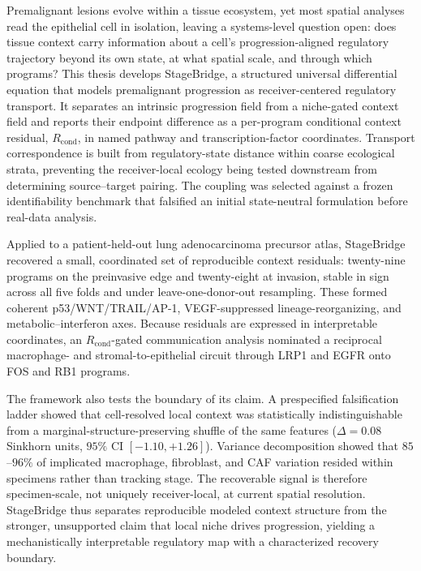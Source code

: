 
Premalignant lesions evolve within a tissue ecosystem, yet most spatial analyses read the epithelial
cell in isolation, leaving a systems-level question open: does tissue context carry information about a
cell's progression-aligned regulatory trajectory beyond its own state, at what spatial scale, and through
which programs? This thesis develops StageBridge, a structured universal differential equation that
models premalignant progression as receiver-centered regulatory transport. It separates an intrinsic
progression field from a niche-gated context field and reports their endpoint difference as a per-program
conditional context residual, $R_{\mathrm{cond}}$, in named pathway and transcription-factor coordinates.
Transport correspondence is built from regulatory-state distance within coarse ecological strata,
preventing the receiver-local ecology being tested downstream from determining source--target pairing.
The coupling was selected against a frozen identifiability benchmark that falsified an initial
state-neutral formulation before real-data analysis.

Applied to a patient-held-out lung adenocarcinoma precursor atlas, StageBridge recovered a small,
coordinated set of reproducible context residuals: twenty-nine programs on the preinvasive edge and
twenty-eight at invasion, stable in sign across all five folds and under leave-one-donor-out resampling.
These formed coherent p53/WNT/TRAIL/AP-1, VEGF-suppressed lineage-reorganizing, and
metabolic--interferon axes. Because residuals are expressed in interpretable coordinates, an
$R_{\mathrm{cond}}$-gated communication analysis nominated a reciprocal macrophage- and
stromal-to-epithelial circuit through LRP1 and EGFR onto FOS and RB1 programs.

The framework also tests the boundary of its claim. A prespecified falsification ladder showed that
cell-resolved local context was statistically indistinguishable from a marginal-structure-preserving
shuffle of the same features ($\Delta = 0.08$ Sinkhorn units, $95\%$ CI $[-1.10, +1.26]$). Variance
decomposition showed that $85$--$96\%$ of implicated macrophage, fibroblast, and CAF variation resided
within specimens rather than tracking stage. The recoverable signal is therefore specimen-scale, not
uniquely receiver-local, at current spatial resolution. StageBridge thus separates reproducible modeled
context structure from the stronger, unsupported claim that local niche drives progression, yielding a
mechanistically interpretable regulatory map with a characterized recovery boundary.

